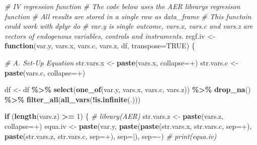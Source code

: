 \documentclass[
]{book}
\newenvironment{Shaded}{\begin{snugshade}}{\end{snugshade}}
\newcommand{\CommentTok}[1]{\textcolor[rgb]{0.56,0.35,0.01}{\textit{#1}}}
\newcommand{\ControlFlowTok}[1]{\textcolor[rgb]{0.13,0.29,0.53}{\textbf{#1}}}
\newcommand{\DataTypeTok}[1]{\textcolor[rgb]{0.13,0.29,0.53}{#1}}
\newcommand{\DecValTok}[1]{\textcolor[rgb]{0.00,0.00,0.81}{#1}}
\newcommand{\KeywordTok}[1]{\textcolor[rgb]{0.13,0.29,0.53}{\textbf{#1}}}
\newcommand{\NormalTok}[1]{#1}
\newcommand{\OperatorTok}[1]{\textcolor[rgb]{0.81,0.36,0.00}{\textbf{#1}}}
\newcommand{\OtherTok}[1]{\textcolor[rgb]{0.56,0.35,0.01}{#1}}
\newcommand{\StringTok}[1]{\textcolor[rgb]{0.31,0.60,0.02}{#1}}
\begin{document}
\begin{Shaded}
\begin{Highlighting}[]
\CommentTok{\# IV regression function}
\CommentTok{\# The code below uses the AER library\textquotesingle{}s regresison function}
\CommentTok{\# All results are stored in a single row as data\_frame}
\CommentTok{\# This functoin could work with dplyr do}
\CommentTok{\# var.y is single outcome, vars.x, vars.c and vars.z are vectors of endogenous variables, controls and instruments.}
\NormalTok{regf.iv \textless{}{-}}\StringTok{ }\ControlFlowTok{function}\NormalTok{(var.y, vars.x, }
\NormalTok{                    vars.c, vars.z, df, }\DataTypeTok{transpose=}\OtherTok{TRUE}\NormalTok{) \{}
  
  \CommentTok{\# A. Set{-}Up Equation}
\NormalTok{  str.vars.x \textless{}{-}}\StringTok{ }\KeywordTok{paste}\NormalTok{(vars.x, }\DataTypeTok{collapse=}\StringTok{\textquotesingle{}+\textquotesingle{}}\NormalTok{)}
\NormalTok{  str.vars.c \textless{}{-}}\StringTok{ }\KeywordTok{paste}\NormalTok{(vars.c, }\DataTypeTok{collapse=}\StringTok{\textquotesingle{}+\textquotesingle{}}\NormalTok{)}
  
\NormalTok{  df \textless{}{-}}\StringTok{ }\NormalTok{df }\OperatorTok{\%\textgreater{}\%}\StringTok{ }
\StringTok{    }\KeywordTok{select}\NormalTok{(}\KeywordTok{one\_of}\NormalTok{(var.y, vars.x, vars.c, vars.z)) }\OperatorTok{\%\textgreater{}\%}\StringTok{ }
\StringTok{    }\KeywordTok{drop\_na}\NormalTok{() }\OperatorTok{\%\textgreater{}\%}\StringTok{ }\KeywordTok{filter\_all}\NormalTok{(}\KeywordTok{all\_vars}\NormalTok{(}\OperatorTok{!}\KeywordTok{is.infinite}\NormalTok{(.)))}
  
  \ControlFlowTok{if}\NormalTok{ (}\KeywordTok{length}\NormalTok{(vars.z) }\OperatorTok{\textgreater{}=}\StringTok{ }\DecValTok{1}\NormalTok{) \{}
    \CommentTok{\#     library(AER)}
\NormalTok{    str.vars.z \textless{}{-}}\StringTok{ }\KeywordTok{paste}\NormalTok{(vars.z, }\DataTypeTok{collapse=}\StringTok{\textquotesingle{}+\textquotesingle{}}\NormalTok{)}
\NormalTok{    equa.iv \textless{}{-}}\StringTok{ }\KeywordTok{paste}\NormalTok{(var.y,}
                     \KeywordTok{paste}\NormalTok{(}\KeywordTok{paste}\NormalTok{(str.vars.x, str.vars.c, }\DataTypeTok{sep=}\StringTok{\textquotesingle{}+\textquotesingle{}}\NormalTok{),}
                           \KeywordTok{paste}\NormalTok{(str.vars.z, str.vars.c, }\DataTypeTok{sep=}\StringTok{\textquotesingle{}+\textquotesingle{}}\NormalTok{),}
                           \DataTypeTok{sep=}\StringTok{\textquotesingle{}|\textquotesingle{}}\NormalTok{),}
                     \DataTypeTok{sep=}\StringTok{\textquotesingle{}\textasciitilde{}\textquotesingle{}}\NormalTok{)}
    \CommentTok{\#     print(equa.iv)}
    

\end{Highlighting}
\end{Shaded}
\end{document}
